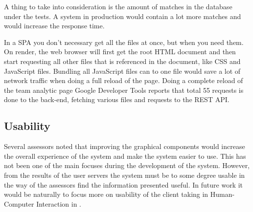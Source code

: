 A thing to take into consideration is the amount of matches in the database under the tests. A system in production would contain a lot more matches and would increase the response time. 

In a \ac{SPA} you don't necessary get all the files at once, but when you need them. On render, the web browser will first get the root \ac{HTML} document and then start requesting all other files that is referenced in the document, like \ac{CSS} and JavaScript files. Bundling all JavaScript files can to one file would save a lot of network traffic when doing a full reload of the page. Doing a complete reload of the team analytic page Google Developer Tools reports that total 55 requests is done to the back-end, fetching various files and requests to the REST API.

\subsection{Usability}

Several assessors noted that improving the graphical components would increase the overall experience of the system and make the system easier to use. This has not been one of the main focuses during the development of the system. However, from the results of the user servers the system must be to some degree usable in the way of the assessors find the information presented useful. In future work it would be naturally to focus more on usability of the client taking in Human-Computer Interaction in \cite{hci}.







